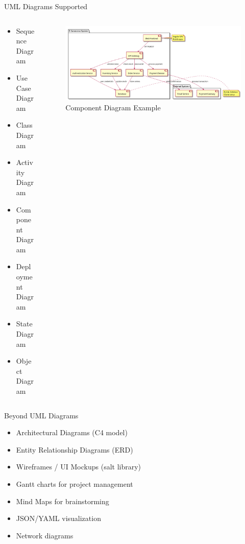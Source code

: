 \documentclass{beamer}
\begin{document}
\begin{frame}{UML Diagrams Supported}
    \begin{columns}
    \begin{column}{0.4\textwidth}
        \begin{itemize}
            \item Sequence Diagram
            \item Use Case Diagram
            \item Class Diagram
            \item Activity Diagram
            \item Component Diagram
            \item Deployment Diagram
            \item State Diagram
            \item Object Diagram
        \end{itemize}
    \end{column}
    \begin{column}{0.6\textwidth}
        \centering
        \begin{figure}
        \begin{center}
            \includegraphics[width=\textwidth]{images/component.png}
        \end{center}
        \caption{Component Diagram Example}
        \end{figure}
        
    \end{column}
    \end{columns}
\end{frame}

\begin{frame}{Beyond UML Diagrams}
    \begin{itemize}
        \item Architectural Diagrams (C4 model)
        \item Entity Relationship Diagrams (ERD)
        \item Wireframes / UI Mockups (salt library)
        \item Gantt charts for project management
        \item Mind Maps for brainstorming
        \item JSON/YAML visualization
        \item Network diagrams
    \end{itemize}
\end{frame}
\end{document}
